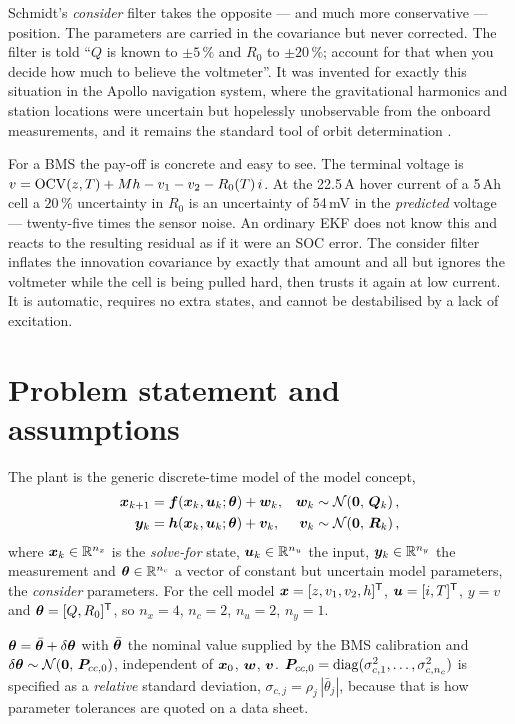 Schmidt's \emph{consider} filter \cite{schmidt1966} takes the opposite --- and much more
conservative --- position.  The parameters are carried in the covariance but never corrected.
The filter is told ``$Q$ is known to $\pm5\,\%$ and $R_0$ to $\pm20\,\%$; account for that when
you decide how much to believe the voltmeter''.  It was invented for exactly this situation in
the Apollo navigation system, where the gravitational harmonics and station locations were
uncertain but hopelessly unobservable from the onboard measurements, and it remains the standard
tool of orbit determination \cite[Ch.~6]{tapley2004}.

For a BMS the pay-off is concrete and easy to see.  The terminal voltage is
$v = \mathrm{OCV}(z,T) + M h - v_1 - v_2 - R_0(T)\,i$.  At the 22.5\,A hover current of a
5\,Ah cell a $20\,\%$ uncertainty in $R_0$ is an uncertainty of 54\,mV in the
\emph{predicted} voltage --- twenty-five times the sensor noise.  An ordinary EKF does not know
this and reacts to the resulting residual as if it were an SOC error.  The consider filter
inflates the innovation covariance by exactly that amount and all but ignores the voltmeter while
the cell is being pulled hard, then trusts it again at low current.  It is automatic, requires no
extra states, and cannot be destabilised by a lack of excitation.

\section{Problem statement and assumptions}
The plant is the generic discrete-time model of the  model concept,
\begin{align}
\bm{x}_{k+1} &= \bm{f}(\bm{x}_k,\bm{u}_k;\bm{\theta}) + \bm{w}_k, & \bm{w}_k &\sim \mathcal{N}\!\left(\bm 0,\,\bm{Q}_k\right), \label{eq:sk-f}\\
\bm{y}_k &= \bm{h}(\bm{x}_k,\bm{u}_k;\bm{\theta}) + \bm{v}_k, & \bm{v}_k &\sim \mathcal{N}\!\left(\bm 0,\,\bm{R}_k\right), \label{eq:sk-h}
\end{align}
where $\bm{x}_k\in\mathbb{R}^{n_x}$ is the \emph{solve-for} state, $\bm{u}_k\in\mathbb{R}^{n_u}$ the input,
$\bm{y}_k\in\mathbb{R}^{n_y}$ the measurement and
$\bm{\theta}\in\mathbb{R}^{n_c}$ a vector of constant but uncertain model parameters, the
\emph{consider} parameters.  For the cell model $\bm{x}=[z,v_1,v_2,h]^{\mathsf{T}}$, $\bm{u}=[i,T]^{\mathsf{T}}$, $y=v$
and $\bm{\theta}=[Q,R_0]^{\mathsf{T}}$, so $n_x=4$, $n_c=2$, $n_u=2$, $n_y=1$.

\begin{assumption}\label{as:sk-prior}
$\bm{\theta} = \bar{\bm{\theta}} + \delta\bm{\theta}$ with $\bar{\bm{\theta}}$ the nominal value supplied by the
BMS calibration and $\delta\bm{\theta}\sim\mathcal{N}\!\left(\bm 0,\,\bm{P}_{cc,0}\right)$, independent of $\bm{x}_0$, $\bm{w}$, $\bm{v}$.
$\bm{P}_{cc,0}=\operatorname{diag}(\sigma_{c,1}^2,\dots,\sigma_{c,n_c}^2)$ is specified as a \emph{relative}
standard deviation, $\sigma_{c,j}=\rho_j\,|\bar{\theta}_j|$, because that is how parameter
tolerances are quoted on a data sheet.
\end{assumption}


